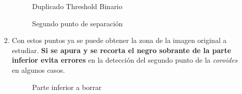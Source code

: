 \begin{enumerate}
\begin{enumerate}[label*=\arabic*.]
    \begin{figure}[H]
      \caption{Duplicado Threshold Binario}
      \centering \setlength\fboxsep{0pt} \setlength\fboxrule{0.5pt}
    \end{figure}

    \begin{figure}[H]
      \caption{Segundo punto de separación}
      \centering \setlength\fboxsep{0pt} \setlength\fboxrule{0.5pt}
    \end{figure}

  \item Con estos puntos ya se puede obtener la zona de la imagen
    original a estudiar. \textbf{Si se apura y se recorta el negro
      sobrante de la parte inferior evita errores} en la detección del
    segundo punto de la \emph{\gls{coroides}} en algunos casos.

    \begin{figure}[H]
      \caption{Parte inferior a borrar}
      \centering \setlength\fboxsep{0pt} \setlength\fboxrule{0.5pt}
    \end{figure}


\end{enumerate}
\end{enumerate}
